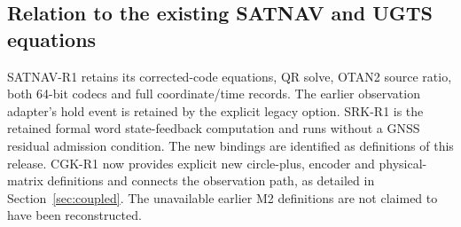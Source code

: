 \subsection{Relation to the existing SATNAV and UGTS equations}
SATNAV-R1 retains its corrected-code equations, QR solve, OTAN2 source ratio,
both 64-bit codecs and full coordinate/time records. The earlier observation adapter's
hold event is retained by the explicit legacy option. SRK-R1 is the retained formal word
state-feedback computation and runs without a GNSS residual admission condition.
The new bindings are identified as definitions of this release. CGK-R1 now provides explicit new circle-plus, encoder and physical-matrix
definitions and connects the observation path, as detailed in Section~\ref{sec:coupled}.
The unavailable earlier M2 definitions are not claimed to have been reconstructed.
\clearpage


